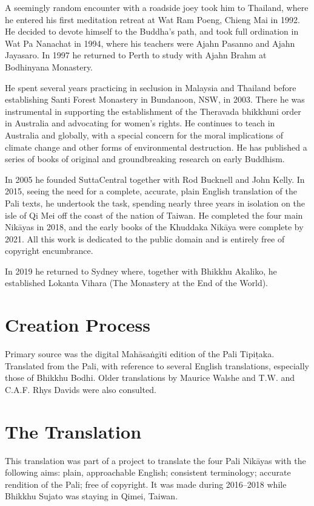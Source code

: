 \documentclass[12pt,openany]{book}%
\begin{document}
A seemingly random encounter with a roadside joey took him to Thailand, where he entered his first meditation retreat at Wat Ram Poeng, Chieng Mai in 1992. He decided to devote himself to the Buddha’s path, and took full ordination in Wat Pa Nanachat in 1994, where his teachers were Ajahn Pasanno and Ajahn Jayasaro. In 1997 he returned to Perth to study with Ajahn Brahm at Bodhinyana Monastery. 

He spent several years practicing in seclusion in Malaysia and Thailand before establishing Santi Forest Monastery in Bundanoon, NSW, in 2003. There he was instrumental in supporting the establishment of the Theravada bhikkhuni order in Australia and advocating for women’s rights. He continues to teach in Australia and globally, with a special concern for the moral implications of climate change and other forms of environmental destruction. He has published a series of books of original and groundbreaking research on early Buddhism. 

In 2005 he founded SuttaCentral together with Rod Bucknell and John Kelly. In 2015, seeing the need for a complete, accurate, plain English translation of the Pali texts, he undertook the task, spending nearly three years in isolation on the isle of Qi Mei off the coast of the nation of Taiwan. He completed the four main \textsanskrit{Nikāyas} in 2018, and the early books of the Khuddaka \textsanskrit{Nikāya} were complete by 2021. All this work is dedicated to the public domain and is entirely free of copyright encumbrance. 

In 2019 he returned to Sydney where, together with Bhikkhu Akaliko, he established Lokanta Vihara (The Monastery at the End of the World). 

\section*{Creation Process}

Primary source was the digital \textsanskrit{Mahāsaṅgīti} edition of the Pali \textsanskrit{Tipiṭaka}. Translated from the Pali, with reference to several English translations, especially those of Bhikkhu Bodhi. Older translations by Maurice Walshe and T.W. and C.A.F. Rhys Davids were also consulted.

\section*{The Translation}

This translation was part of a project to translate the four Pali \textsanskrit{Nikāyas} with the following aims: plain, approachable English; consistent terminology; accurate rendition of the Pali; free of copyright. It was made during 2016–2018 while Bhikkhu Sujato was staying in Qimei, Taiwan.
\end{document}
